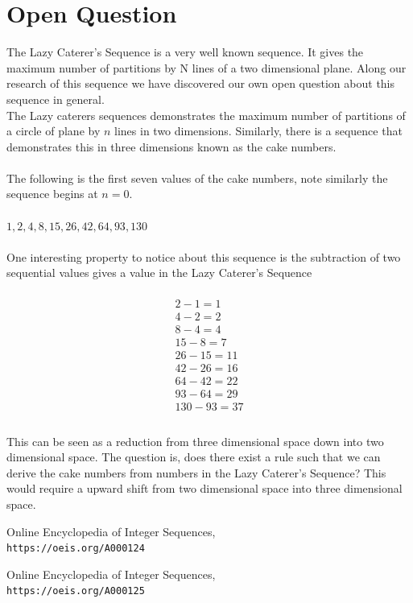 \documentclass[a4paper,10pt]{article}
\begin{document}
\section{Open Question}
The Lazy Caterer's Sequence is a very well known sequence. It gives the maximum number of partitions by N lines of a two dimensional plane. Along our research of this sequence we have discovered our own open question about this sequence in general.
\\
The Lazy caterers sequences demonstrates the maximum number of partitions of a circle of plane by $n$ lines in two dimensions. Similarly, there is a sequence that demonstrates this in three dimensions known as the cake numbers.\\
\\
The following is the first seven values of the cake numbers, note similarly the sequence begins at $n=0$.\\
\\
$1, 2, 4, 8, 15, 26, 42, 64, 93, 130$\\
\\
One interesting property to notice about this sequence is the subtraction of two sequential values gives a value in the Lazy Caterer's Sequence\\
\\
\[
\boxed{
	\begin{gathered}
		{2-1 = 1}\\
		{4-2 = 2} \\
		{8-4 = 4} \\
		{15-8 = 7} \\
		{26-15 = 11}\\
		{42-26 = 16}\\
		{64-42 = 22}\\
		{93-64 = 29}\\
		{130-93 = 37}\\
	\end{gathered}
	}
\]
\\
This can be seen as a reduction from three dimensional space down into two dimensional space. The question is, does there exist a rule such that we can derive the cake numbers from numbers in the Lazy Caterer's Sequence? This would require a upward shift from two dimensional space into three dimensional space.

\begin{thebibliography}{1}
Online Encyclopedia of Integer Sequences, \\
\texttt{https://oeis.org/A000124}

Online Encyclopedia of Integer Sequences, \\
\texttt{https://oeis.org/A000125}

\end{thebibliography}
\end{document}
